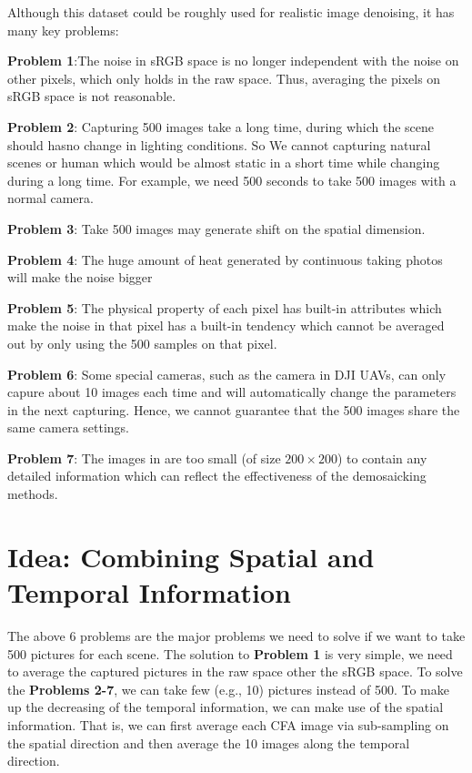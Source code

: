 \documentclass[10pt,twocolumn,letterpaper]{article}
\begin{document}
Although this dataset could be roughly used for realistic image denoising, it has many key problems:

\textbf{Problem 1}:The noise in sRGB space is no longer independent with the noise on other pixels, which only holds in the raw space. Thus, averaging the pixels on sRGB space is not reasonable. 

\textbf{Problem 2}: Capturing 500 images take a long time, during which the scene should hasno change in lighting conditions. So We cannot capturing natural scenes or human which would be almost static in a short time while changing during a long time. For example, we need 500 seconds to take 500 images with a normal camera. 

\textbf{Problem 3}: Take 500 images may generate shift on the spatial dimension.

\textbf{Problem 4}: The huge amount of heat generated by continuous taking photos  will make the noise bigger

\textbf{Problem 5}: The physical property of each pixel has built-in attributes which make the noise in that pixel has a built-in tendency which cannot be averaged out by only using the 500 samples on that pixel.

\textbf{Problem 6}: Some special cameras, such as the camera in DJI UAVs, can only capure about 10 images each time and will automatically change the parameters in the next capturing. Hence, we cannot guarantee that the 500 images share the same camera settings.

\textbf{Problem 7}: The images in \cite{khashabi2014joint} are too small (of size $200\times 200$) to contain any detailed information which can reflect the effectiveness of the demosaicking methods.


\section{Idea: Combining Spatial and Temporal Information}

The above 6 problems are the major problems we need to solve if we want to take 500 pictures for each scene. The solution to \textbf{Problem 1} is very simple, we need to average the captured pictures in the raw space other the sRGB space. To solve the \textbf{Problems 2-7}, we can take few (e.g., 10) pictures instead of 500. To make up the decreasing of the temporal information, we can make use of the spatial information. That is, we can first average each CFA image via sub-sampling on the spatial direction and then average the 10 images along the temporal direction.
\end{document}
